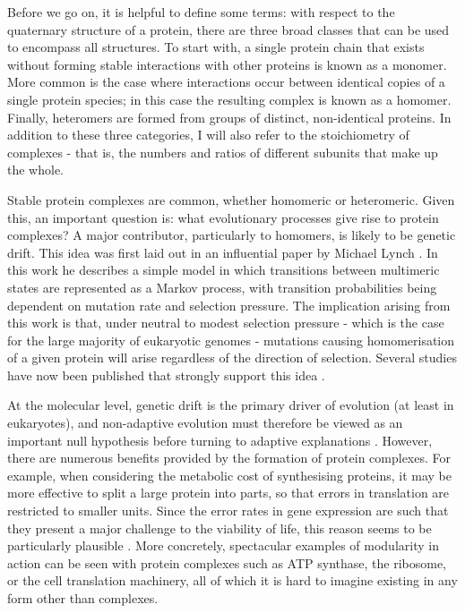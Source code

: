 \documentclass[a4paper,11pt,twoside,openright]{scrbook}
\begin{document}
Before we go on, it is helpful to define some terms: with respect to the quaternary structure of a protein, there are three broad classes that can be used to encompass all structures. To start with, a single protein chain that exists without forming stable interactions with other proteins is known as a monomer. More common is the case where interactions occur between identical copies of a single protein species; in this case the resulting complex is known as a homomer. Finally, heteromers are formed from groups of distinct, non-identical proteins. In addition to these three categories, I will also refer to the stoichiometry of complexes - that is, the numbers and ratios of different subunits that make up the whole.

Stable protein complexes are common, whether homomeric or heteromeric. Given this, an important question is: what evolutionary processes give rise to protein complexes? A major contributor, particularly to homomers, is likely to be genetic drift. This idea was first laid out in an influential paper by Michael Lynch \cite{Lynch2013}. In this work he describes a simple model in which transitions between multimeric states are represented as a Markov process, with transition probabilities being dependent on mutation rate and selection pressure. The implication arising from this work is that, under neutral to modest selection pressure - which is the case for the large majority of eukaryotic genomes - mutations causing homomerisation of a given protein will arise regardless of the direction of selection. Several studies have now been published that strongly support this idea \cite{Dayhoff2010,Alexander2017,Garcia-Seisdedos2017}.

At the molecular level, genetic drift is the primary driver of evolution (at least in eukaryotes), and non-adaptive evolution must therefore be viewed as an important null hypothesis before turning to adaptive explanations \cite{Gould1979,Koonin2016}. However, there are numerous benefits provided by the formation of protein complexes. For example, when considering the metabolic cost of synthesising proteins, it may be more effective to split a large protein into parts, so that errors in translation are restricted to smaller units. Since the error rates in gene expression are such that they present a major challenge to the viability of life, this reason seems to be particularly plausible \cite{Gingold2011}. More concretely, spectacular examples of modularity in action can be seen with protein complexes such as ATP synthase, the ribosome, or the cell translation machinery, all of which it is hard to imagine existing in any form other than complexes.
\end{document}
